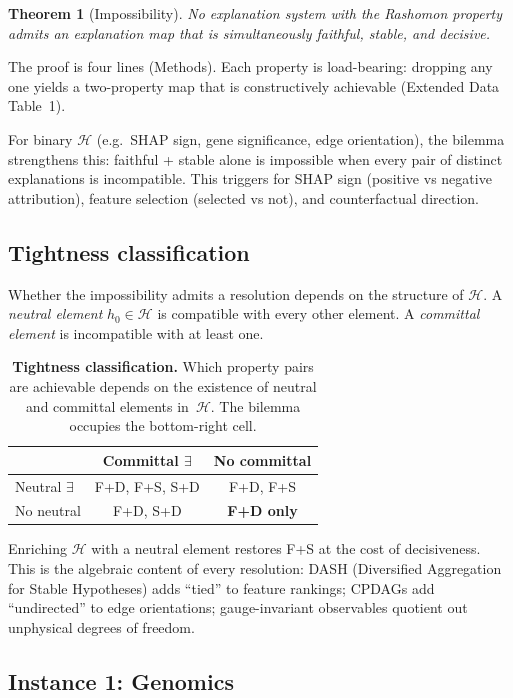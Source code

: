 \documentclass[11pt]{article}
\newcommand{\sH}{\mathcal{H}}
\newtheorem{theorem}{Theorem}
\begin{document}
\begin{theorem}[Impossibility]
\label{thm:impossibility}
No explanation system with the Rashomon property admits an explanation
map that is simultaneously faithful, stable, and decisive.
\end{theorem}

The proof is four lines (Methods). Each property is load-bearing: dropping
any one yields a two-property map that is constructively achievable
(Extended Data Table~1).

For binary $\sH$ (e.g.\ SHAP sign, gene significance, edge
orientation), the bilemma strengthens this: faithful + stable alone is
impossible when every pair of distinct explanations is incompatible.
This triggers for SHAP sign (positive vs negative attribution), feature
selection (selected vs not), and counterfactual direction.

\subsection*{Tightness classification}

Whether the impossibility admits a resolution depends on the structure of
$\sH$.  A \emph{neutral element} $h_0 \in \sH$ is compatible with every
other element.  A \emph{committal element} is incompatible with at least
one.

\begin{table}[h]
\centering
\small
\caption{\textbf{Tightness classification.} Which property pairs are
  achievable depends on the existence of neutral and committal elements
  in~$\sH$.  The bilemma occupies the bottom-right cell.}
\label{tab:tightness}
\begin{tabular}{@{}lcc@{}}
\toprule
 & Committal $\exists$ & No committal \\
\midrule
Neutral $\exists$ & F+D, F+S, S+D & F+D, F+S \\
No neutral & F+D, S+D & \textbf{F+D only} \\
\bottomrule
\end{tabular}
\end{table}

Enriching $\sH$ with a neutral element restores F+S at the cost of
decisiveness.  This is the algebraic content of every resolution:
DASH (Diversified Aggregation for Stable Hypotheses) adds ``tied'' to feature rankings; CPDAGs add ``undirected'' to edge
orientations; gauge-invariant observables quotient out unphysical
degrees of freedom.

\subsection*{Instance 1: Genomics}
\end{document}
